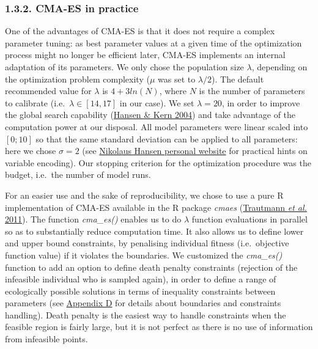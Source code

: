 \documentclass[11pt,]{article}
\begin{document}
\hypertarget{cma-es-in-practice}{%
\subsubsection{1.3.2. CMA-ES in practice}\label{cma-es-in-practice}}

One of the advantages of CMA-ES is that it does not require a complex
parameter tuning: as best parameter values at a given time of the
optimization process might no longer be efficient later, CMA-ES
implements an internal adaptation of its parameters. We only chose the
population size \(\lambda\), depending on the optimization problem
complexity (\(\mu\) was set to \(\lambda/2\)). The default recommended
value for \(\lambda\) is \(4 + 3 ln(N)\), where \(N\) is the number of
parameters to calibrate (i.e.~\(\lambda \in [14,17]\) in our case). We
set \(\lambda = 20\), in order to improve the global search capability
(\protect\hyperlink{ref-Hansen2004}{Hansen \& Kern 2004}) and take
advantage of the computation power at our disposal. All model parameters
were linear scaled into \([0;10]\) so that the same standard deviation
can be applied to all parameters: here we chose \(\sigma = 2\) (see
\href{https://cma-es.github.io/cmaes_sourcecode_page.html\#practical}{Nikolaus
Hansen personal website} for practical hints on variable encoding). Our
stopping criterion for the optimization procedure was the budget,
i.e.~the number of model runs.

For an easier use and the sake of reproducibility, we chose to use a
pure R implementation of CMA-ES available in the R package \emph{cmaes}
(\protect\hyperlink{ref-Trautmann2011}{Trautmann \emph{et al.} 2011}).
The function \emph{cma\_es()} enables us to do \(\lambda\) function
evaluations in parallel so as to substantially reduce computation time.
It also allows us to define lower and upper bound constraints, by
penalising individual fitness (i.e.~objective function value) if it
violates the boundaries. We customized the \emph{cma\_es()} function to
add an option to define death penalty constraints (rejection of the
infeasible individual who is sampled again), in order to define a range
of ecologically possible solutions in terms of inequality constraints
between parameters (see \protect\hyperlink{appendixD}{Appendix D} for
details about boundaries and constraints handling). Death penalty is the
easiest way to handle constraints when the feasible region is fairly
large, but it is not perfect as there is no use of information from
infeasible points.
\end{document}
